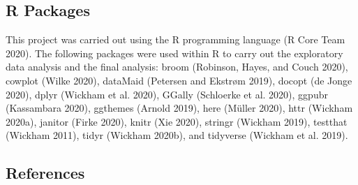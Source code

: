 \documentclass[
]{article}
\begin{document}
\hypertarget{r-packages}{%
\subsection{R Packages}\label{r-packages}}

This project was carried out using the R programming language (R Core
Team 2020). The following packages were used within R to carry out the
exploratory data analysis and the final analysis: broom (Robinson,
Hayes, and Couch 2020), cowplot (Wilke 2020), dataMaid (Petersen and
Ekstrøm 2019), docopt (de Jonge 2020), dplyr (Wickham et al. 2020),
GGally (Schloerke et al. 2020), ggpubr (Kassambara 2020), ggthemes
(Arnold 2019), here (Müller 2020), httr (Wickham 2020a), janitor (Firke
2020), knitr (Xie 2020), stringr (Wickham 2019), testthat (Wickham
2011), tidyr (Wickham 2020b), and tidyverse (Wickham et al. 2019).

\hypertarget{references}{%
\subsection*{References}\label{references}}
\end{document}
